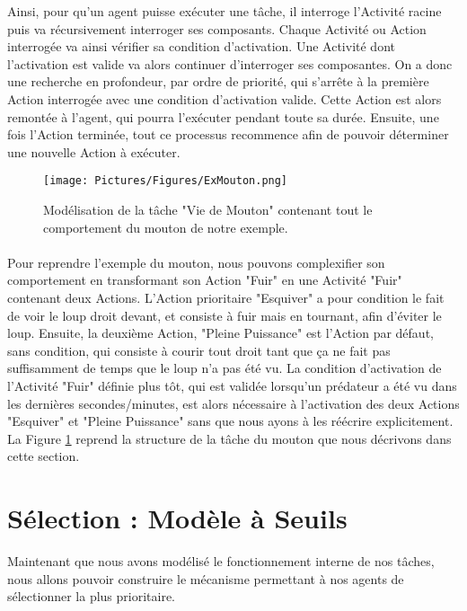 			Ainsi, pour qu'un agent puisse exécuter une tâche, il interroge l'Activité racine puis va récursivement interroger ses composants. Chaque Activité ou Action interrogée va ainsi vérifier sa condition d'activation. Une Activité dont l'activation est valide va alors continuer d'interroger ses composantes. On a donc une recherche en profondeur, par ordre de priorité, qui s'arrête à la première Action interrogée avec une condition d'activation valide. Cette Action est alors remontée à l'agent, qui pourra l'exécuter pendant toute sa durée. Ensuite, une fois l'Action terminée, tout ce processus recommence afin de pouvoir déterminer une nouvelle Action à exécuter.
			
			\begin{figure}
			\centering
			\texttt{[image: Pictures/Figures/ExMouton.png]}
			\caption{Modélisation de la tâche "Vie de Mouton" contenant tout le comportement du mouton de notre exemple.}
			\label{TacheMouton}
			\end{figure}
			
			\paragraph{}
			Pour reprendre l'exemple du mouton, nous pouvons complexifier son comportement en transformant son Action "Fuir" en une Activité "Fuir" contenant deux Actions. L'Action prioritaire "Esquiver" a pour condition le fait de voir le loup droit devant, et consiste à fuir mais en tournant, afin d'éviter le loup. Ensuite, la deuxième Action, "Pleine Puissance" est l'Action par défaut, sans condition, qui consiste à courir tout droit tant que ça ne fait pas suffisamment de temps que le loup n'a pas été vu. La condition d'activation de l'Activité "Fuir" définie plus tôt, qui est validée lorsqu'un prédateur a été vu dans les dernières secondes/minutes, est alors nécessaire à l'activation des deux Actions "Esquiver" et "Pleine Puissance" sans que nous ayons à les réécrire explicitement. La Figure \ref{TacheMouton} reprend la structure de la tâche du mouton que nous décrivons dans cette section.
			
	
			
	\section{Sélection : Modèle à Seuils}
		Maintenant que nous avons modélisé le fonctionnement interne de nos tâches, nous allons pouvoir construire le mécanisme permettant à nos agents de sélectionner la plus prioritaire.
		
